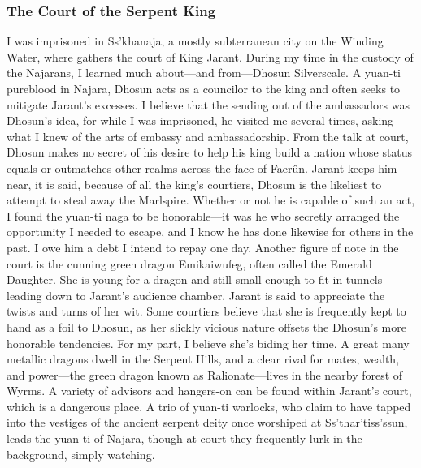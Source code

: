 \documentclass[10pt,a4paper,twoside,twocolumn,openany,bg=print,nodeprecatedcode]{dndbook}
\begin{document}
\subsubsection{The Court of the Serpent King}
I was imprisoned in Ss'khanaja, a mostly subterranean city on the Winding Water, where gathers the court of King Jarant.
During my time in the custody of the Najarans, I learned much about—and from—Dhosun Silverscale. A yuan-ti pureblood in Najara, Dhosun acts as a councilor to the king and often seeks to mitigate Jarant's excesses. I believe that the sending out of the ambassadors was Dhosun's idea, for while I was imprisoned, he visited me several times, asking what I knew of the arts of embassy and ambassadorship. From the talk at court, Dhosun makes no secret of his desire to help his king build a nation whose status equals or outmatches other realms across the face of Faerûn. Jarant keeps him near, it is said, because of all the king's courtiers, Dhosun is the likeliest to attempt to steal away the Marlspire. Whether or not he is capable of such an act, I found the yuan-ti naga to be honorable—it was he who secretly arranged the opportunity I needed to escape, and I know he has done likewise for others in the past. I owe him a debt I intend to repay one day.
Another figure of note in the court is the cunning green dragon Emikaiwufeg, often called the Emerald Daughter. She is young for a dragon and still small enough to fit in tunnels leading down to Jarant's audience chamber. Jarant is said to appreciate the twists and turns of her wit. Some courtiers believe that she is frequently kept to hand as a foil to Dhosun, as her slickly vicious nature offsets the Dhosun's more honorable tendencies. For my part, I believe she's biding her time. A great many metallic dragons dwell in the Serpent Hills, and a clear rival for mates, wealth, and power—the green dragon known as Ralionate—lives in the nearby forest of Wyrms.
A variety of advisors and hangers-on can be found within Jarant's court, which is a dangerous place. A trio of yuan-ti warlocks, who claim to have tapped into the vestiges of the ancient serpent deity once worshiped at Ss'thar'tiss'ssun, leads the yuan-ti of Najara, though at court they frequently lurk in the background, simply watching.
\end{document}
